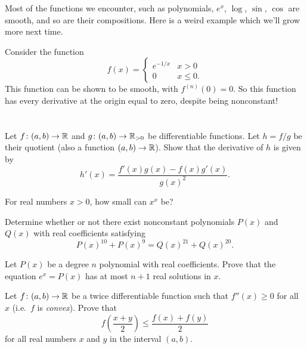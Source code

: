 Most of the functions we encounter,
such as polynomials, $e^x$, $\log$, $\sin$, $\cos$
are smooth, and so are their compositions.
Here is a weird example which we'll grow more next time.
\begin{example}
	Consider the function
	\[ f(x) = \begin{cases}
			e^{-1/x} & x > 0 \\
			0 & x \le 0.
		\end{cases}
	\]
	This function can be shown to be smooth,
	with $f^{(n)}(0) = 0$.
	So this function has every derivative at the origin
	equal to zero, despite being nonconstant!
\end{example}

\section{\problemhead}
\begin{problem}
	Let $f \colon (a,b) \to \mathbb R$ and $g \colon (a,b) \to \mathbb R_{>0}$
	be differentiable functions.
	Let $h = f/g$ be their quotient
	(also a function $(a,b) \to \mathbb R$).
	Show that the derivative of $h$ is given by
	\[ h'(x) = \frac{f'(x) g(x) - f(x) g'(x)}{g(x)^2}. \]
\end{problem}

\begin{problem}
	For real numbers $x > 0$, how small can $x^x$ be?
\end{problem}

\begin{problem}
	[RMM 2018]
	\onechili
	Determine whether or not there exist
	nonconstant polynomials $P(x)$ and $Q(x)$ with
	real coefficients satisfying
	\[ P(x)^{10} + P(x)^9 = Q(x)^{21} + Q(x)^{20}. \]
\end{problem}

\begin{problem}
	\onechili
	Let $P(x)$ be a degree $n$ polynomial with real coefficients.
	Prove that the equation $e^x = P(x)$ has at most $n+1$ real solutions in $x$.
\end{problem}

\begin{problem}
	Let $f \colon (a,b) \to \mathbb R$ be a twice differentiable function
	such that $f''(x) \ge 0$ for all $x$
	(i.e.\ $f$ is \emph{convex}).
	Prove that
	\[ f\left( \frac{x+y}{2} \right)
		\le \frac{f(x) + f(y)}{2} \]
	for all real numbers $x$ and $y$ in the interval $(a,b)$.
\end{problem}

